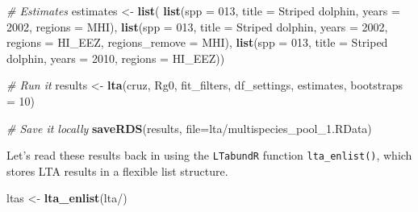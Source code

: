 \documentclass[
]{book}
\newenvironment{Shaded}{\begin{snugshade}}{\end{snugshade}}
\newcommand{\AttributeTok}[1]{\textcolor[rgb]{0.13,0.29,0.53}{#1}}
\newcommand{\CommentTok}[1]{\textcolor[rgb]{0.56,0.35,0.01}{\textit{#1}}}
\newcommand{\DecValTok}[1]{\textcolor[rgb]{0.00,0.00,0.81}{#1}}
\newcommand{\FunctionTok}[1]{\textcolor[rgb]{0.13,0.29,0.53}{\textbf{#1}}}
\newcommand{\NormalTok}[1]{#1}
\newcommand{\OtherTok}[1]{\textcolor[rgb]{0.56,0.35,0.01}{#1}}
\newcommand{\StringTok}[1]{\textcolor[rgb]{0.31,0.60,0.02}{#1}}
\begin{document}
\begin{Shaded}
\begin{Highlighting}[]
\CommentTok{\# Estimates}
\NormalTok{estimates }\OtherTok{\textless{}{-}} \FunctionTok{list}\NormalTok{(}
    \FunctionTok{list}\NormalTok{(}\AttributeTok{spp =} \StringTok{\textquotesingle{}013\textquotesingle{}}\NormalTok{,}
         \AttributeTok{title =} \StringTok{\textquotesingle{}Striped dolphin\textquotesingle{}}\NormalTok{,}
         \AttributeTok{years =} \DecValTok{2002}\NormalTok{,}
         \AttributeTok{regions =} \StringTok{\textquotesingle{}MHI\textquotesingle{}}\NormalTok{),}
    \FunctionTok{list}\NormalTok{(}\AttributeTok{spp =} \StringTok{\textquotesingle{}013\textquotesingle{}}\NormalTok{,}
         \AttributeTok{title =} \StringTok{\textquotesingle{}Striped dolphin\textquotesingle{}}\NormalTok{,}
         \AttributeTok{years =} \DecValTok{2002}\NormalTok{,}
         \AttributeTok{regions =} \StringTok{\textquotesingle{}HI\_EEZ\textquotesingle{}}\NormalTok{,}
         \AttributeTok{regions\_remove =} \StringTok{\textquotesingle{}MHI\textquotesingle{}}\NormalTok{),}
    \FunctionTok{list}\NormalTok{(}\AttributeTok{spp =} \StringTok{\textquotesingle{}013\textquotesingle{}}\NormalTok{,}
         \AttributeTok{title =} \StringTok{\textquotesingle{}Striped dolphin\textquotesingle{}}\NormalTok{,}
         \AttributeTok{years =} \DecValTok{2010}\NormalTok{,}
         \AttributeTok{regions =} \StringTok{\textquotesingle{}HI\_EEZ\textquotesingle{}}\NormalTok{))}

\CommentTok{\# Run it}
\NormalTok{results }\OtherTok{\textless{}{-}} \FunctionTok{lta}\NormalTok{(cruz, Rg0, }
\NormalTok{               fit\_filters, df\_settings, estimates, }
               \AttributeTok{bootstraps =} \DecValTok{10}\NormalTok{)}

\CommentTok{\# Save it locally}
\FunctionTok{saveRDS}\NormalTok{(results, }\AttributeTok{file=}\StringTok{\textquotesingle{}lta/multispecies\_pool\_1.RData\textquotesingle{}}\NormalTok{)}
\end{Highlighting}
\end{Shaded}

Let's read these results back in using the \texttt{LTabundR} function \texttt{lta\_enlist()}, which stores LTA results in a flexible list structure.

\begin{Shaded}
\begin{Highlighting}[]
\NormalTok{ltas }\OtherTok{\textless{}{-}} \FunctionTok{lta\_enlist}\NormalTok{(}\StringTok{\textquotesingle{}lta/\textquotesingle{}}\NormalTok{)}
\end{Highlighting}
\end{Shaded}
\end{document}
